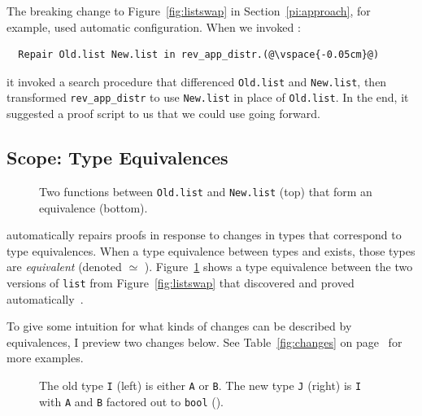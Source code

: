 The breaking change to Figure~\ref{fig:listswap} in Section~\ref{pi:approach}, for example, used automatic configuration.
When we invoked \toolnamec:

\begin{lstlisting}
  Repair Old.list New.list in rev_app_distr.(@\vspace{-0.05cm}@)
\end{lstlisting}
it invoked a search procedure that differenced \lstinline{Old.list} and \lstinline{New.list},
then transformed \lstinline{rev_app_distr} to use \lstinline{New.list} in place of \lstinline{Old.list}.
In the end, it suggested a proof script to us that we could use going forward.

\subsection{Scope: Type Equivalences}
\label{sec:pi-scope}

\begin{figure}
\vspace{-0.3cm}
\caption{Two functions between \lstinline{Old.list} and \lstinline{New.list} (top) that form an equivalence (bottom).}
\label{fig:equivalence}
\end{figure}

\toolnamec automatically repairs proofs in response to changes in types that correspond to type equivalences.
When a type equivalence between types \Aa and \B exists, those types are \textit{equivalent} (denoted \Aa $\simeq$ \B). %
Figure~\ref{fig:equivalence} shows a type equivalence between the two versions of \lstinline{list}
from Figure~\ref{fig:listswap} that \toolnamec discovered and proved automatically~\href{https://github.com/uwplse/pumpkin-pi/blob/v2.0.0/plugin/coq/Swap.v}{}.

To give some intuition for what kinds of changes can be described by equivalences, I preview two changes below.
See Table~\ref{fig:changes} on page~\pageref{fig:changes} for more examples.

\begin{figure}
\begin{minipage}{0.48\columnwidth}

\end{minipage}
\hfill
\begin{minipage}{0.48\columnwidth}

\end{minipage}
\vspace{-0.4cm}
\caption{The old type \lstinline{I} (left) is either \lstinline{A} or \lstinline{B}. The new type \lstinline{J} (right) is \lstinline{I} with \lstinline{A} and \lstinline{B} factored out to \lstinline{bool} ().}
\label{fig:equivalence2}
\end{figure}

